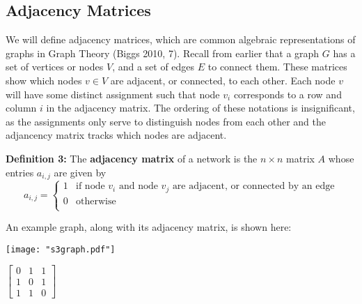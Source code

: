 \documentclass{article}
\begin{document}
\bigskip

\subsection{Adjacency Matrices}
We will define adjacency matrices, which are common algebraic representations of graphs in Graph Theory (Biggs 2010, 7).
Recall from earlier that a graph $G$ has a set of vertices or nodes $V$, and a set of edges $E$ to connect them.
These matrices show which nodes $v \in V$ are adjacent, or connected, to each other. 
Each node $v$ will have some distinct assignment such that node $v_i$ corresponds to a row and column $i$ in the adjacency matrix. 
The ordering of these notations is insignificant, as the assignments only serve to distinguish nodes from each other and the adjancency matrix tracks which nodes are adjacent. 

\bigskip

\textbf{Definition 3:} The \textbf{adjacency matrix} of a network is the $n \times n$ matrix $A$ whose entries $a_{i,j}$ are given by
\[   
a_{i,j} = 
     \begin{cases}
       1 & \text{if node } v_i \text{ and node } v_j \text{ are adjacent, or connected by an edge} \\
       0 & \text{otherwise} \\
     \end{cases}
\]

\bigskip

An example graph, along with its adjacency matrix, is shown here:

\bigskip

\noindent\begin{minipage}{.5\textwidth}
\centering
\texttt{[image: "s3graph.pdf"]}
\label{fig:fig1}            
\end{minipage}%
\begin{minipage}{.5\textwidth}
\centering
\vspace{1.2cm}
$\begin{bmatrix}
0 & 1 & 1\\
1 & 0 & 1\\
1 & 1 & 0
\end{bmatrix}$
\vspace{1.1cm}

\label{fig:fig2}            
\end{minipage}

\bigskip
\end{document}
